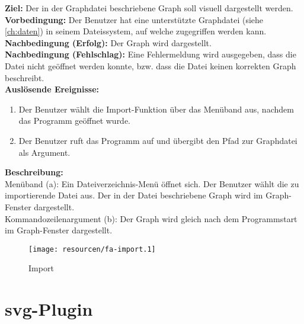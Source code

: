 \label{fa:import}
\textbf{Ziel:} Der in der Graphdatei beschriebene Graph soll visuell dargestellt werden.\\
\textbf{Vorbedingung:} Der Benutzer hat eine unterstützte Graphdatei (siehe \ref{ch:daten}) in seinem Dateissystem, auf welche zugegriffen werden kann.\\
\textbf{Nachbedingung (Erfolg):} Der Graph wird dargestellt.\\
\textbf{Nachbedingung (Fehlschlag):}
Eine Fehlermeldung wird ausgegeben, dass die Datei nicht geöffnet werden konnte, bzw. dass die Datei keinen korrekten Graph beschreibt.\\
\textbf{Auslösende Ereignisse:}
\begin{enumerate}[nolistsep, label=(\alph*)]
  \item Der Benutzer wählt die Import-Funktion über das Menüband aus, nachdem das Programm geöffnet wurde. %
  \item Der Benutzer ruft das Programm auf und übergibt den Pfad zur Graphdatei als Argument. %
\end{enumerate}
\textbf{Beschreibung:}\\
Menüband (a): Ein Dateiverzeichnis-Menü öffnet sich. %
Der Benutzer wählt die zu importierende Datei aus.
Der in der Datei beschriebene Graph wird im Graph-Fenster dargestellt.\\%
Kommandozeilenargument (b): Der Graph wird gleich nach dem Programmstart im Graph-Fenster dargestellt. \\

\begin{figure}[ht]
  \centering
  \texttt{[image: resourcen/fa-import.1]}
  \caption{Import}
  \label{fig:import}
\end{figure}


\section{\gls{svg}-Plugin}

